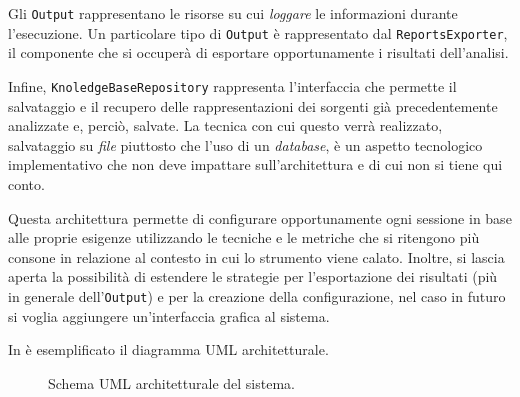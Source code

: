 Gli \texttt{Output} rappresentano le risorse su cui \textit{loggare} le informazioni durante l'esecuzione.
%
Un particolare tipo di \texttt{Output} è rappresentato dal \texttt{ReportsExporter}, il componente che si occuperà di esportare opportunamente i risultati dell'analisi.

Infine, \texttt{KnoledgeBaseRepository} rappresenta l'interfaccia che permette il salvataggio e il recupero delle rappresentazioni dei sorgenti già precedentemente analizzate e, perciò, salvate.
%
La tecnica con cui questo verrà realizzato, salvataggio su \textit{file} piuttosto che l'uso di un \textit{database}, è un aspetto tecnologico implementativo che non deve impattare sull'architettura e di cui non si tiene qui conto.

Questa architettura permette di configurare opportunamente ogni sessione in base alle proprie esigenze utilizzando le tecniche e le metriche che si ritengono più consone in relazione al contesto in cui lo strumento viene calato.
%
Inoltre, si lascia aperta la possibilità di estendere le strategie per l'esportazione dei risultati (più in generale dell'\texttt{Output}) e per la creazione della configurazione, nel caso in futuro si voglia aggiungere un'interfaccia grafica al sistema.

In  è esemplificato il diagramma UML architetturale.

\begin{figure}[h!]
    \caption{Schema UML architetturale del sistema.}
    \label{img:02-architecture}
\end{figure}

